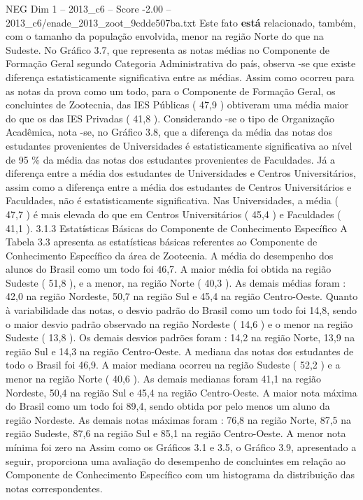 \begin{textsample}{NEG Dim 1 – 2013\_c6 – Score -2.00 – 2013\_c6/enade\_2013\_zoot\_9cdde507ba.txt}
Este fato \textbf{está} relacionado, também, com o tamanho da população envolvida, menor na região Norte do que na Sudeste.
No Gráfico 3.7, que representa as notas médias no Componente de Formação Geral segundo Categoria Administrativa do país, observa -se que existe diferença estatisticamente significativa entre as médias.
Assim como ocorreu para as notas da prova como um todo, para o Componente de Formação Geral, os concluintes de Zootecnia, das IES Públicas ( 47,9 ) obtiveram uma média maior do que os das IES Privadas ( 41,8 ).
Considerando -se o tipo de Organização Acadêmica, nota -se, no Gráfico 3.8, que a diferença da média das notas dos estudantes provenientes de Universidades é estatisticamente significativa ao nível de 95 \% da média das notas dos estudantes provenientes de Faculdades.
Já a diferença entre a média dos estudantes de Universidades e Centros Universitários, assim como a diferença entre a média dos estudantes de Centros Universitários e Faculdades, não é estatisticamente significativa.
Nas Universidades, a média ( 47,7 ) é mais elevada do que em Centros Universitários ( 45,4 ) e Faculdades ( 41,1 ). 3.1.3 Estatísticas Básicas do Componente de Conhecimento Específico A Tabela 3.3 apresenta as estatísticas básicas referentes ao Componente de Conhecimento Específico da área de Zootecnia.
A média do desempenho dos alunos do Brasil como um todo foi 46,7.
A maior média foi obtida na região Sudeste ( 51,8 ), e a menor, na região Norte ( 40,3 ).
As demais médias foram : 42,0 na região Nordeste, 50,7 na região Sul e 45,4 na região Centro-Oeste.
Quanto à variabilidade das notas, o desvio padrão do Brasil como um todo foi 14,8, sendo o maior desvio padrão observado na região Nordeste ( 14,6 ) e o menor na região Sudeste ( 13,8 ).
Os demais desvios padrões foram : 14,2 na região Norte, 13,9 na região Sul e 14,3 na região Centro-Oeste.
A mediana das notas dos estudantes de todo o Brasil foi 46,9.
A maior mediana ocorreu na região Sudeste ( 52,2 ) e a menor na região Norte ( 40,6 ).
As demais medianas foram 41,1 na região Nordeste, 50,4 na região Sul e 45,4 na região Centro-Oeste.
A maior nota máxima do Brasil como um todo foi 89,4, sendo obtida por pelo menos um aluno da região Nordeste.
As demais notas máximas foram : 76,8 na região Norte, 87,5 na região Sudeste, 87,6 na região Sul e 85,1 na região Centro-Oeste.
A menor nota mínima foi zero na Assim como os Gráficos 3.1 e 3.5, o Gráfico 3.9, apresentado a seguir, proporciona uma avaliação do desempenho de concluintes em relação ao Componente de Conhecimento Específico com um histograma da distribuição das notas correspondentes.

\end{textsample}
